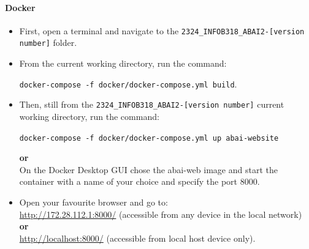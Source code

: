 \paragraph{\fontsize{14}{17}\selectfont Docker}
\begin{itemize}
  \item First, open a terminal and navigate to the \texttt{2324\_INFOB318\_ABAI2-[\texttt{version number}]} folder.
  \item From the current working directory, run the command:
  \begin{codebox}
    \texttt{docker-compose -f docker/docker-compose.yml build}.
  \end{codebox}
  \item Then,  still from the \texttt{2324\_INFOB318\_ABAI2-[\texttt{version number}]} current working directory, run the command:
  \begin{codebox}
    \texttt{docker-compose -f docker/docker-compose.yml up abai-website}
  \end{codebox}
  \textbf{or} \\
  On the Docker Desktop GUI chose the abai-web image and start the container with a name of your choice and specify the port 8000.
  \item Open your favourite browser and go to: \\
  \url{http://172.28.112.1:8000/} (accessible from any device in the local network) \\
  \textbf{or} \\
  \url{http://localhost:8000/} (accessible from local host device only).
\end{itemize}


